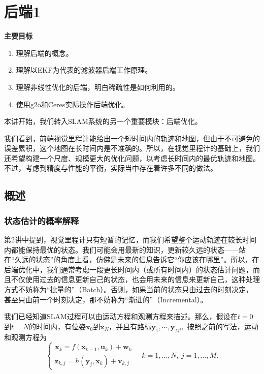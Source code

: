 \chapter{后端1}
\label{cpt:backend1}
\begin{mdframed}  
	\textbf{主要目标}
	\begin{enumerate}[labelindent=0em,leftmargin=1.5em]
		\item 理解后端的概念。
		\item 理解以EKF为代表的滤波器后端工作原理。
		\item 理解非线性优化的后端，明白稀疏性是如何利用的。
		\item 使用g2o和Ceres实际操作后端优化。
	\end{enumerate}
\end{mdframed}

本讲开始，我们转入SLAM系统的另一个重要模块：后端优化。

我们看到，前端视觉里程计能给出一个短时间内的轨迹和地图，但由于不可避免的误差累积，这个地图在长时间内是不准确的。所以，在视觉里程计的基础上，我们还希望构建一个尺度、规模更大的优化问题，以考虑长时间内的最优轨迹和地图。不过，考虑到精度与性能的平衡，实际当中存在着许多不同的做法。

\newpage


\newpage
\section{概述}
\subsection{状态估计的概率解释}
第2讲中提到，视觉里程计只有短暂的记忆，而我们希望整个运动轨迹在较长时间内都能保持最优的状态。我们可能会用最新的知识，更新较久远的状态——站在“久远的状态”的角度上看，仿佛是未来的信息告诉它“你应该在哪里”。所以，在后端优化中，我们通常考虑一段更长时间内（或所有时间内）的状态估计问题，而且不仅使用过去的信息更新自己的状态，也会用未来的信息来更新自己，这种处理方式不妨称为“批量的”（Batch）。否则，如果当前的状态只由过去的时刻决定，甚至只由前一个时刻决定，那不妨称为“渐进的”（Incremental）。

我们已经知道SLAM过程可以由运动方程和观测方程来描述。那么，假设在$t=0$到$t=N$的时间内，有位姿$\bm{x}_0$到$\bm{x}_N$，并且有路标$\bm{y}_1, \cdots, \bm{y}_M$。按照之前的写法，运动和观测方程为
\begin{equation}
\left\{ \begin{array}{l}
{\bm{x}_k} = f\left( {{\bm{x}_{k - 1}},{\bm{u}_k}} \right) + \bm{w}_k \\
{\bm{z}_{k,j}} = h\left( {{ \bm{y}_j},{ \bm{x}_k}}  \right)+ \bm{v}_{k,j}
   \end{array} \right. \quad k=1, \ldots, N, \  j=1, \ldots, M.
\end{equation}

